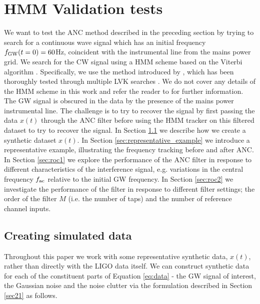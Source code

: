 \documentclass[pra,superscriptaddress,reprint,amsmath,amssymb,nofootinbib]{revtex4-2}
\begin{document}
\section{HMM Validation tests} \label{sec:results}
We want to test the ANC method described in the preceding section by trying to search for a continuous wave signal which has an initial frequency $f_{\rm GW}(t=0) = 60 $Hz, coincident with the instrumental line from the mains power grid. We search for the CW signal using a HMM scheme based on the Viterbi algorithm \cite{Viterbi1,viterbi2}. Specifically, we use the method introduced by \citet{Suvorova2016PhRv}, which has been thoroughly tested through multiple LVK searches \cite{Piccinni2022,Riles2023,Wette2023}. We do not cover any details of the HMM scheme in this work and refer the reader to \citet{Suvorova2016PhRv} for further information. The GW signal is obscured in the data by the presence of the mains power instrumental line. The challenge is to try to recover the signal by first passing the data $x(t)$ through the ANC filter before using the HMM tracker on this filtered dataset to try to recover the signal. In Section \ref{sec:creating_data} we describe how we create a synthetic dataset $x(t)$. In Section \ref{sec:representative_example} we introduce a representative example, illustrating the frequency tracking before and after ANC. In Section \ref{sec:roc1} we explore the performance of the ANC filter in response to different characteristics of the interference signal, e.g. variations in the central frequency $f_{\rm ac}$ relative to the initial GW frequency. In Section \ref{sec:roc2} we investigate the performance of the filter in response to different filter settings; the order of the filter $M$ (i.e. the number of taps) and the number of reference channel inputs.

\subsection{Creating simulated data} \label{sec:creating_data}
Throughout this paper we work with some representative synthetic data, $x(t)$, rather than directly with the LIGO data itself. We can construct synthetic data for each of the constituent parts of Equation \eqref{eq:data} - the GW signal of interest, the Gaussian noise and the noise clutter via the formulation described in Section \ref{sec21} as follows. \newline 
\end{document}
